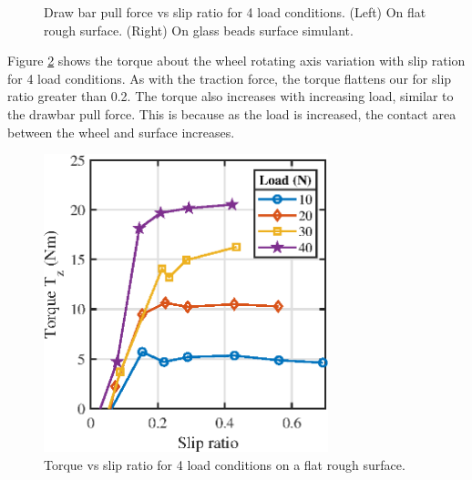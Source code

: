 \documentclass{article}
\begin{document}
\begin{figure}[hbt!]
\begin{minipage}{0.45\textwidth}
    \end{minipage}
    \caption{Draw bar pull force vs slip ratio for 4 load conditions. (Left) On flat rough surface. (Right) On glass beads surface simulant.}
    \label{fig:drawbar-pull-vs-slip-ratio}
\end{figure}

Figure \ref{fig:torque-vs-slip-ratio-flat} shows the torque about the wheel rotating axis variation with slip ration for 4 load conditions. As with the traction force, the torque flattens our for slip ratio greater than 0.2. The torque also increases with increasing load, similar to the drawbar pull force. This is because as the load is increased, the contact area between the wheel and surface increases. 

\begin{figure}[hbt!]
\centering
\includegraphics[width=3.25in]{plots/torque-vs-slip-ratio-flat.eps}
\caption{Torque vs slip ratio for 4 load conditions on a flat rough surface.}
\label{fig:torque-vs-slip-ratio-flat}
\end{figure}
\end{document}
